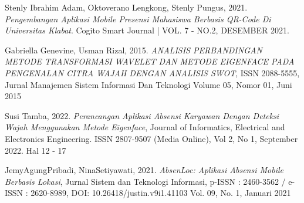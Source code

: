 \documentclass[12pt,a4paper]{report}
\begin{document}
\begin{thebibliography}{9}
Stenly Ibrahim Adam, Oktoverano Lengkong, Stenly Pungus, 2021. \emph{Pengembangan Aplikasi Mobile Presensi Mahasiswa Berbasis QR-Code Di Universitas Klabat}. Cogito Smart Journal | VOL. 7 - NO.2, DESEMBER 2021.

Gabriella Genevine, Usman Rizal, 2015. \emph{ANALISIS PERBANDINGAN METODE TRANSFORMASI WAVELET DAN METODE EIGENFACE PADA PENGENALAN CITRA WAJAH DENGAN ANALISIS SWOT}, ISSN 2088-5555, Jurnal Manajemen Sistem Informasi Dan Teknologi Volume 05, Nomor 01, Juni 2015

Susi Tamba, 2022. \emph{Perancangan Aplikasi Absensi Karyawan Dengan Deteksi Wajah Menggunakan Metode Eigenface}, Journal of Informatics, Electrical and Electronics Engineering. ISSN 2807-9507 (Media Online), Vol 2, No 1, September 2022. Hal 12 - 17

JemyAgungPribadi, NinaSetiyawati, 2021. \emph{AbsenLoc: Aplikasi Absensi Mobile Berbasis Lokasi},  Jurnal Sistem dan Teknologi Informasi, p-ISSN : 2460-3562 / e-ISSN : 2620-8989, DOI: 10.26418/justin.v9i1.41103 Vol. 09, No. 1, Januari 2021

\end{thebibliography}
\end{document}
